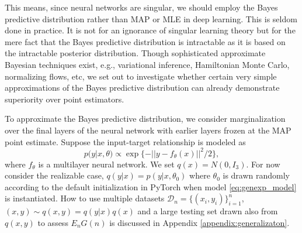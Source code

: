 \documentclass{article} %
\begin{document}
This means, since neural networks are singular, we should employ the Bayes predictive distribution rather than MAP or MLE in deep learning. This is seldom done in practice. It is not for an ignorance of singular learning theory but for the mere fact that the Bayes predictive distribution is intractable as it is based on the intractable posterior distribution. 
Though sophisticated approximate Bayesian techniques exist, e.g., variational inference, Hamiltonian Monte Carlo, normalizing flows, etc, we set out to investigate whether certain very simple approximations of the Bayes predictive distribution can already demonstrate superiority over point estimators. 

To approximate the Bayes predictive distribution, we consider marginalization over the final layers of the neural network with earlier layers frozen at the MAP point estimate. Suppose the input-target relationship is modeled as
\begin{equation}
p(y|x,\theta) \propto \exp\{-|| y - f_\theta(x) ||^2/2\},
\label{eq:genexp_model}
\end{equation}
where $f_\theta$ is a multilayer neural network.
We set $q(x) = N(0,I_3)$. 
For now consider the realizable case, $q(y|x) = p(y|x,\theta_0)$ where $\theta_0$ is drawn randomly according to the default initialization in PyTorch when model \ref{eq:genexp_model} is instantiated. How to use multiple datasets $\mathcal D_n = \{(x_i,y_i)\}_{i=1}^n$, $(x,y) \sim q(x,y) = q(y|x)q(x)$ and a large testing set drawn also from $q(x,y)$ to assess $E_n G(n)$ is discussed in Appendix \ref{appendix:generalizaton}. 
\end{document}
